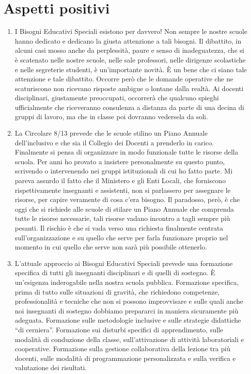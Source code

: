 \section*{Aspetti positivi}
\begin{enumerate}
	\item I Bisogni Educativi Speciali esistono per davvero! Non sempre le nostre scuole hanno dedicato e dedicano la giusta attenzione a tali bisogni. Il dibattito, in alcuni casi mosso anche da perplessità, paure e senso di inadeguatezza, che si è scatenato nelle nostre scuole, nelle sale professori, nelle dirigenze scolastiche e nelle segreterie studenti, è un'importante novità. È un bene che ci siano tale attenzione e tale dibattito. Occorre però che le domande operative che ne scaturiscono non ricevano risposte ambigue o lontane dalla realtà.
	Ai docenti disciplinari, giustamente preoccupati, occorrerà che qualcuno spieghi ufficialmente che riceveranno consulenza a distanza da parte di una decina di gruppi di lavoro, ma che in classe poi dovranno vedersela da soli.
	\item  La Circolare 8/13 prevede che le scuole stilino un Piano Annuale dell'inclusivo e che sia il Collegio dei Docenti a prenderlo in carico. Finalmente si pensa di organizzare in modo funzionale tutte le risorse della scuola. Per anni ho provato a insistere personalmente su questo punto, scrivendo o intervenendo nei gruppi istituzionali di cui ho fatto parte. Mi pareva assurdo il fatto che il Ministero e gli Enti Locali, che forniscono rispettivamente insegnanti e assistenti, non si parlassero per assegnare le risorse, per capire veramente di cosa c'era bisogno. Il paradosso, però, è che oggi che si richiede alle scuole di stilare un Piano Annuale che comprenda tutte le risorse necessarie, tali risorse vadano incontro a tagli sempre più pesanti.
	Il rischio è che si vada verso una richiesta finalmente centrata sull'organizzazione e su quello che serve per farla funzionare proprio nel momento in cui quello che serve non sarà più possibile ottenerlo.
	\item  L'attuale approccio ai Bisogni Educativi Speciali prevede una formazione specifica di tutti gli insegnanti disciplinari e di quelli di sostegno. È un'esigenza inderogabile nella nostra scuola pubblica. Formazione specifica, prima di tutto sulle situazioni di gravità, che richiedono competenze, professionalità e tecniche che non si possono improvvisare e sulle quali anche noi insegnanti di sostegno dobbiamo prepararci in maniera sicuramente più adeguata. Formazione sulle metodologie inclusive e sulle strategie didattiche “di cerniera”. Formazione sui disturbi specifici di apprendimento, sulle modalità di conduzione della classe, sull'attivazione di attività laboratoriali e cooperative. Formazione sulla gestione collaborativa della lezione tra più docenti, sulle modalità di programmazione personalizzata e sulla verifica e valutazione dei risultati.

\end{enumerate}
